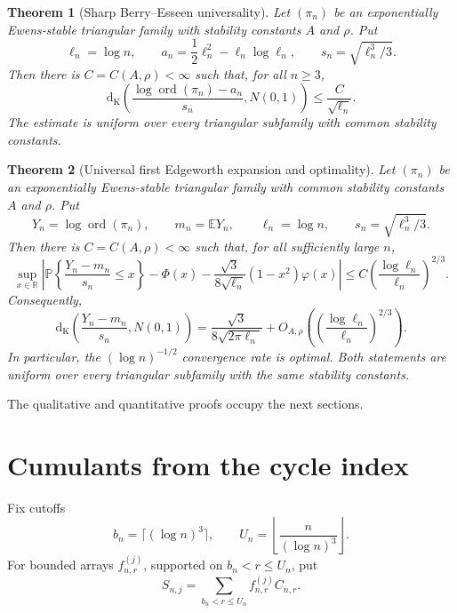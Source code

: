 \documentclass[11pt]{article}
\newtheorem{theorem}{Theorem}[section]
\theoremstyle{definition}
\theoremstyle{remark}
\newcommand{\Pp}{\mathbb P}
\newcommand{\Ee}{\mathbb E}
\newcommand{\ord}{\operatorname{ord}}
\newcommand{\Kol}{\mathrm d_{\mathrm K}}
\newcommand{\R}{\mathbb R}
\begin{document}
\begin{theorem}[Sharp Berry--Esseen universality]
\label{thm:sharp-be}
Let $(\pi_n)$ be an exponentially Ewens-stable triangular family with
stability constants $A$ and $\rho$.  Put
\[
 \ell_n=\log n,
 \qquad
 a_n=\frac12\ell_n^2-\ell_n\log\ell_n,
 \qquad
 s_n=\sqrt{\ell_n^3/3}.
\]
Then there is $C=C(A,\rho)<\infty$ such that, for all $n\ge3$,
\begin{equation}\label{eq:sharp-be}
 \Kol\!\left(
 \frac{\log\ord(\pi_n)-a_n}{s_n},N(0,1)
 \right)
 \le \frac{C}{\sqrt{\ell_n}}.
\end{equation}
The estimate is uniform over every triangular subfamily with common
stability constants.
\end{theorem}

\begin{theorem}[Universal first Edgeworth expansion and optimality]
\label{thm:edgeworth}
Let $(\pi_n)$ be an exponentially Ewens-stable triangular family with
common stability constants $A$ and $\rho$.  Put
\[
 Y_n=\log\ord(\pi_n),\qquad
 m_n=\Ee Y_n,\qquad
 \ell_n=\log n,\qquad
 s_n=\sqrt{\ell_n^3/3}.
\]
Then there is $C=C(A,\rho)<\infty$ such that, for all sufficiently large
$n$,
\begin{equation}\label{eq:edgeworth}
 \sup_{x\in\R}\left|
 \Pp\left\{\frac{Y_n-m_n}{s_n}\le x\right\}
 -\Phi(x)
 -\frac{\sqrt3}{8\sqrt{\ell_n}}(1-x^2)\varphi(x)
 \right|
 \le
 C\left(\frac{\log\ell_n}{\ell_n}\right)^{2/3}.
\end{equation}
Consequently,
\begin{equation}\label{eq:kol-exact}
 \Kol\!\left(\frac{Y_n-m_n}{s_n},N(0,1)\right)
 =
 \frac{\sqrt3}{8\sqrt{2\pi\ell_n}}
 +O_{A,\rho}\!\left(
 \left(\frac{\log\ell_n}{\ell_n}\right)^{2/3}
 \right).
\end{equation}
In particular, the $(\log n)^{-1/2}$ convergence rate is optimal.  Both
statements are uniform over every triangular subfamily with the same
stability constants.
\end{theorem}

The qualitative and quantitative proofs occupy the next sections.

\section{Cumulants from the cycle index}

Fix cutoffs
\[
 b_n=\lceil(\log n)^3\rceil,
 \qquad
 U_n=\left\lfloor\frac{n}{(\log n)^3}\right\rfloor.
\]
For bounded arrays $f_{n,r}^{(j)}$, supported on $b_n<r\le U_n$, put
\[
 S_{n,j}=\sum_{b_n<r\le U_n}f_{n,r}^{(j)}C_{n,r}.
\]
\end{document}
